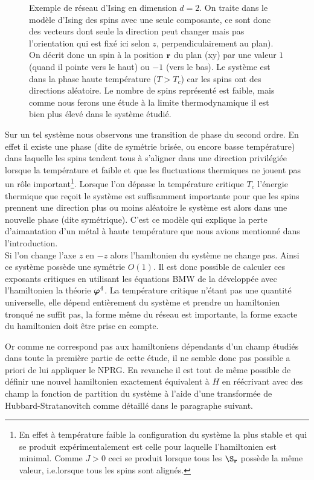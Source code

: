 \documentclass[10pt]{article}
\begin{document}
\begin{multicols}{2}
\begin{figure}[H]
\begin{center}
\begin{picture}
\end{picture}
\end{center}
\caption{Exemple de réseau d'Ising en dimension $d=2$. On traite dans le modèle d'Ising des spins avec une seule composante, ce sont donc des vecteurs dont seule la direction peut changer mais pas l'orientation qui est fixé ici selon $z$, perpendiculairement au plan). On décrit donc un spin à la position $\rv$ du plan (xy) par une valeur $1$ (quand il pointe vers le haut) ou $-1$ (vers le bas). Le système est dans la phase haute température ($T>T_c$) car les spins ont des directions aléatoire. Le nombre de spins représenté est faible, mais comme nous ferons une étude à la limite thermodynamique il est bien plus élevé dans le système étudié.}
	\label{fig:schemaIsing}
\end{figure}
Sur un tel système nous observons une transition de phase du second ordre. En effet il existe une phase (dite de symétrie brisée, ou encore basse température) dans laquelle les spins tendent tous à s'aligner dans une direction privilégiée lorsque la température et faible et que les fluctuations thermiques ne jouent pas un rôle important\footnote{En effet à température faible la configuration du système la plus stable et qui se produit expérimentalement est celle pour laquelle l'hamiltonien est minimal. Comme $J>0$ ceci se produit lorsque tous les $\S_\rv$ possède la même valeur, i.e.lorsque tous les spins sont alignés.}. Lorsque l'on dépasse la température critique $T_c$ l'énergie thermique que reçoit le système est suffisamment importante pour que les spins prennent une direction plus ou moins aléatoire le système est alors dans une nouvelle phase (dite symétrique). C'est ce modèle qui explique la perte d'aimantation d'un métal à haute température que nous avions mentionné dans l'introduction. \\


Si l'on change l'axe $z$ en $-z$ alors l'hamltonien du système ne change pas. Ainsi ce système possède une symétrie $O(1)$. Il est donc possible de calculer ces exposants critiques en utilisant les équations BMW de la  développée avec l'hamiltonien la théorie $\varphiv^4$. La température critique n'étant pas une quantité universelle, elle dépend entièrement du système et prendre un hamiltonien tronqué ne suffit pas, la forme même du réseau est importante, la forme exacte du hamiltonien doit être prise en compte.

Or comme  ne correspond pas aux hamiltoniens dépendants d'un champ étudiés dans toute la première partie de cette étude, il ne semble donc pas possible a priori de lui appliquer le NPRG. En revanche il est tout de même possible de définir une nouvel hamiltonien exactement équivalent à $H$ en réécrivant avec des champ la fonction de partition du système à l'aide d'une transformée de Hubbard-Stratanovitch comme détaillé dans le paragraphe suivant. \\ 


\end{multicols}
\end{document}
